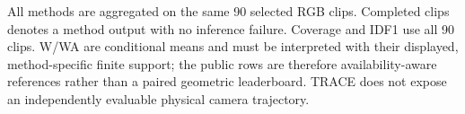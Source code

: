\parbox{0.99\textwidth}{\footnotesize All methods are aggregated on the same 90 selected RGB clips. Completed clips denotes a method output with no inference failure. Coverage and IDF1 use all 90 clips. W/WA are conditional means and must be interpreted with their displayed, method-specific finite support; the public rows are therefore availability-aware references rather than a paired geometric leaderboard. TRACE does not expose an independently evaluable physical camera trajectory.}
